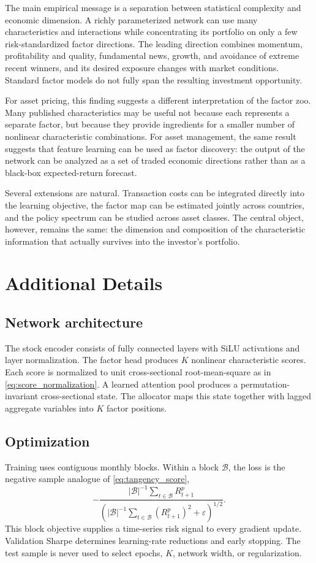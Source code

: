 \documentclass[12pt]{article}
\begin{document}
The main empirical message is a separation between statistical complexity and economic dimension. A richly parameterized network can use many characteristics and interactions while concentrating its portfolio on only a few risk-standardized factor directions. The leading direction combines momentum, profitability and quality, fundamental news, growth, and avoidance of extreme recent winners, and its desired exposure changes with market conditions. Standard factor models do not fully span the resulting investment opportunity.

For asset pricing, this finding suggests a different interpretation of the factor zoo. Many published characteristics may be useful not because each represents a separate factor, but because they provide ingredients for a smaller number of nonlinear characteristic combinations. For asset management, the same result suggests that feature learning can be used as factor discovery: the output of the network can be analyzed as a set of traded economic directions rather than as a black-box expected-return forecast.

Several extensions are natural. Transaction costs can be integrated directly into the learning objective, the factor map can be estimated jointly across countries, and the policy spectrum can be studied across asset classes. The central object, however, remains the same: the dimension and composition of the characteristic information that actually survives into the investor's portfolio.

\appendix
\section{Additional Details}
\subsection{Network architecture}
The stock encoder consists of fully connected layers with SiLU activations and layer normalization. The factor head produces $K$ nonlinear characteristic scores. Each score is normalized to unit cross-sectional root-mean-square as in \eqref{eq:score_normalization}. A learned attention pool produces a permutation-invariant cross-sectional state. The allocator maps this state together with lagged aggregate variables into $K$ factor positions.
\subsection{Optimization}
Training uses contiguous monthly blocks. Within a block $\mathcal{B}$, the loss is the negative sample analogue of \eqref{eq:tangency_score},
\[
-\frac{|\mathcal{B}|^{-1}\sum_{t\in\mathcal{B}}R^p_{t+1}}
{\left(|\mathcal{B}|^{-1}\sum_{t\in\mathcal{B}}(R^p_{t+1})^2+\varepsilon\right)^{1/2}}.
\]
This block objective supplies a time-series risk signal to every gradient update. Validation Sharpe determines learning-rate reductions and early stopping. The test sample is never used to select epochs, $K$, network width, or regularization.
\end{document}
